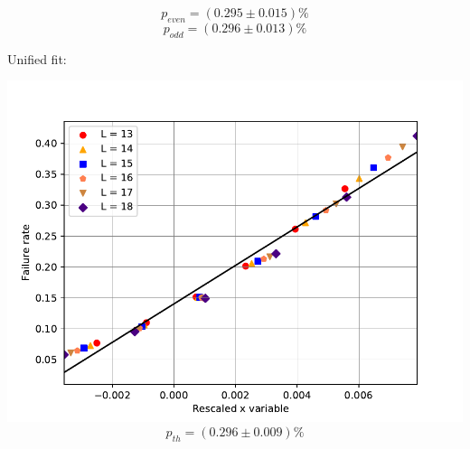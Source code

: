 \documentclass[pra]{revtex4-1}
\begin{document}
\[  p_{even} = (0.295 \pm 0.015)\% \]
\[  p_{odd} = (0.296 \pm 0.013)\% \]
\clearpage 

Unified fit: \begin{center} 

\includegraphics[width=.9\textwidth]{../graphs-paper2/wst-dephasing-rescaled.pdf}
\[  p_{th} = (0.296 \pm 0.009)\% \] \end{center}
\clearpage
\end{document}

